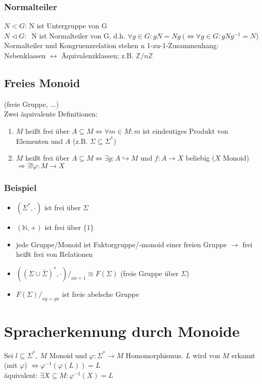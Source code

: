         \subsubsection{Normalteiler}
            $N<G$: N ist Untergruppe von G\\
            $N\triangleleft G:\ $
            N ist Normalteiler von G, d.h. $\forall g\in G : gN=Ng\ (\Leftrightarrow \forall g\in G : gNg^{-1}=N$)\\
            Normalteiler und Kongruenzrelation stehen n 1-zu-1-Zusammenhang: Nebenklassen $\leftrightarrow$ Äquivalenzklassen; z.B. $\mathds{Z}/n\mathds{Z}$
    \subsection{Freies Monoid}
        (freie Gruppe, ...)\\
        Zwei äquivalente Definitionen:
        \begin{enumerate}
            \item $M$ heißt frei über $A\subseteq M\Leftrightarrow \forall m\in M: m$ ist eindeutiges Produkt von Elementen und $A$ (z.B. $\Sigma\subseteq\Sigma^*$)
            \item $M$ heißt frei über $A\subseteq M\Leftrightarrow \exists g:A\hookrightarrow M$ und $f:A\rightarrow X$ beliebig ($X$ Monoid) $\Rightarrow \exists!\varphi:M\rightarrow X$
        \end{enumerate}
        \subsubsection{Beispiel}
            \begin{itemize}
                \item $(\Sigma^*,\cdot)$ ist frei über $\Sigma$
                \item $(\mathds{N},+)$ ist frei über $\{1\}$
                \item jede Gruppe/Monoid ist Faktorgruppe/-monoid einer freien Gruppe $\rightarrow$ frei heißt frei von Relationen
                \item $\left(\left(\Sigma\cup\bar{\Sigma}\right)^*,\cdot \right)/_{a\bar{a}=1}\cong F(\Sigma)$ (freie Gruppe über $\Sigma$)
                \item $F(\Sigma)/_{xy=yx}$ ist freie abelsche Gruppe
            \end{itemize}
\section{Spracherkennung durch Monoide}
    Sei $l\subseteq\Sigma^*,\ M$ Monoid und $\varphi:\Sigma^*\rightarrow M$ Homomorphismus. $L$ wird von $M$ erkannt (mit $\varphi$) $\Leftrightarrow \varphi^{-1}\left(\varphi(L)\right)=L$\\
    äquivalent: $\exists X\subseteq M: \varphi^{-1}(X)=L$
